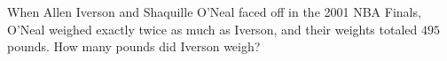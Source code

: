 When Allen Iverson and Shaquille O'Neal faced off in the 2001 NBA Finals, O'Neal weighed exactly twice as much as Iverson, and their weights totaled $495$ pounds. How many pounds did Iverson weigh?
